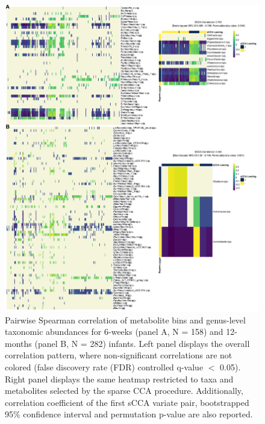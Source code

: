 \begin{figure}[!h]
    \centering
    \includegraphics[width=0.95\linewidth]{figures/appB_fs2.png}
    \caption[Pairwise Spearman correlation of metabolite bins and genus-level taxonomic abundances for 6-weeks (panel A, N = 158) and 12-months (panel B, N = 282) infants.]{Pairwise Spearman correlation of metabolite bins and genus-level taxonomic abundances for 6-weeks (panel A, N = 158) and 12-months (panel B, N = 282) infants. Left panel displays the overall correlation pattern, where non-significant correlations are not colored (false discovery rate (FDR) controlled q-value $<$ 0.05). Right panel displays the same heatmap restricted to taxa and metabolites selected by the sparse CCA procedure. Additionally, correlation coefficient of the first sCCA variate pair, bootstrapped 95\% confidence interval and permutation p-value are also reported.}
    \label{fig:b2}
\end{figure}

